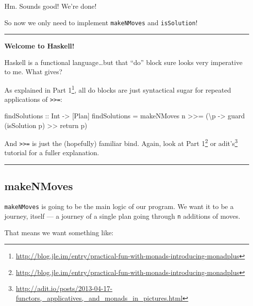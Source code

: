 \documentclass[]{article}
\newenvironment{Shaded}{}{}
\newcommand{\DataTypeTok}[1]{\textcolor[rgb]{0.56,0.13,0.00}{{#1}}}
\newcommand{\OtherTok}[1]{\textcolor[rgb]{0.00,0.44,0.13}{{#1}}}
\newcommand{\FunctionTok}[1]{\textcolor[rgb]{0.02,0.16,0.49}{{#1}}}
\newcommand{\NormalTok}[1]{{#1}}
\renewcommand{\href}[2]{#2\footnote{\url{#1}}}
\begin{document}
Hm. Sounds good! We're done!

So now we only need to implement \texttt{makeNMoves} and \texttt{isSolution}!

\begin{center}\rule{0.5\linewidth}{\linethickness}\end{center}

\textbf{Welcome to Haskell!}

Haskell is a functional language\ldots{}but that ``do'' block sure looks very
imperative to me. What gives?

As explained in
\href{http://blog.jle.im/entry/practical-fun-with-monads-introducing-monadplus}{Part
1}, all do blocks are just syntactical sugar for repeated applications of
\texttt{\textgreater{}\textgreater{}=}:

\begin{Shaded}
\begin{Highlighting}[]
\OtherTok{findSolutions ::} \DataTypeTok{Int} \OtherTok{->} \NormalTok{[}\DataTypeTok{Plan}\NormalTok{]}
\NormalTok{findSolutions }\FunctionTok{=}
    \NormalTok{makeNMoves n }\FunctionTok{>>=} \NormalTok{(\textbackslash{}p }\OtherTok{->} \NormalTok{guard (isSolution p) }\FunctionTok{>>} \NormalTok{return p)}
\end{Highlighting}
\end{Shaded}

And \texttt{\textgreater{}\textgreater{}=} is just the (hopefully) familiar
bind. Again, look at
\href{http://blog.jle.im/entry/practical-fun-with-monads-introducing-monadplus}{Part
1} or
\href{http://adit.io/posts/2013-04-17-functors,_applicatives,_and_monads_in_pictures.html}{adit's}
tutorial for a fuller explanation.

\begin{center}\rule{0.5\linewidth}{\linethickness}\end{center}

\subsection{makeNMoves}\label{makenmoves}

\texttt{makeNMoves} is going to be the main logic of our program. We want it to
be a journey, itself --- a journey of a single plan going through \texttt{n}
additions of moves.

That means we want something like:
\end{document}
